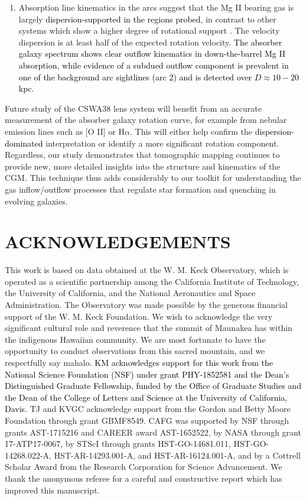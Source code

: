 \documentclass[twocolumn]{aastex62}
\newcommand{\OII}{[O\tiny{ }\footnotesize{II}\normalsize{] }}
\newcommand{\MgII}{Mg\tiny{ }\footnotesize{II}\normalsize{ }}
\begin{document}
\begin{enumerate}
    
    \item Absorption line kinematics in the arcs suggest that the \MgII bearing gas is largely \textcolor{black}{dispersion-supported in the regions probed}, in contrast to other systems which show a higher degree of rotational support \citep{Lopez2018,Lopez2020}. The velocity dispersion is at least half of the expected rotation velocity. \textcolor{black}{The absorber galaxy spectrum shows clear outflow kinematics in down-the-barrel \MgII absorption, while evidence of a subdued outflow component is prevalent in one of the background arc sightlines (arc 2) and is detected over $D \approx 10-20$\,kpc.}
\end{enumerate}

Future study of the CSWA38 lens system will benefit from an accurate measurement of the absorber galaxy rotation curve, for example from nebular emission lines such as \OII or H$\alpha$. This will either help confirm the \textcolor{black}{dispersion-dominated} interpretation or identify a more significant rotation component. 
Regardless, our study demonstrates that tomographic mapping continues to provide new, more detailed insights into the structure and kinematics of the CGM. 
This technique thus adds considerably to our toolkit for understanding the gas inflow/outflow processes that regulate star formation and quenching in evolving galaxies.


\section*{ACKNOWLEDGEMENTS}

This work is based on data obtained at the W. M. Keck Observatory, which is operated as a scientific partnership among the California Institute of Technology, the University of California, and the National Aeronautics and Space Administration. The Observatory was made possible by the generous financial support of the W. M. Keck Foundation. 
We wish to acknowledge the very significant cultural role and reverence that the summit of Maunakea has within the indigenous Hawaiian community. We are most fortunate to have the opportunity to conduct observations from this sacred mountain, and we respectfully say mahalo. 
\textcolor{black}{KM acknowledges support for this work from the National Science Foundation (NSF) under grant PHY-1852581 and the Dean's Distinguished Graduate Fellowship, funded by the Office of Graduate Studies and the Dean of the College of Letters and Science at the University of California, Davis.} TJ and KVGC acknowledge support from the Gordon and Betty Moore Foundation through grant GBMF8549. CAFG was supported by NSF through grants AST-1715216 and CAREER award AST-1652522, by NASA through grant 17-ATP17-0067, by STScI through grants HST-GO-14681.011, HST-GO-14268.022-A, HST-AR-14293.001-A, and HST-AR-16124.001-A, and by a Cottrell Scholar Award from the Research Corporation for Science Advancement. 
We thank the anonymous referee for a careful and constructive report which has improved this manuscript. 
\end{document}
